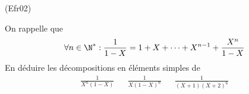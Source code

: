 \begin{tiny}(Efr02)\end{tiny} On rappelle que 
\begin{displaymath}
 \forall n\in \N^* : \frac{1}{1-X}=1+X+\cdots +X^{n-1} + \frac{X^{n}}{1-X}
\end{displaymath}
En déduire les décompositions en éléments simples de
\begin{align*}
 \frac{1}{X^n(1-X)}& & \frac{1}{X(1-X)^n} & &
\frac{1}{(X+1)(X+2)^6}
\end{align*}
